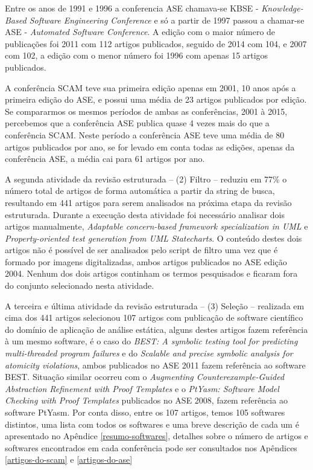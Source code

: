 Entre os anos de 1991 e 1996 a conferencia ASE chamava-se KBSE - {\it
Knowledge-Based Software Engineering Conference} e só a partir de 1997 passou a
chamar-se ASE - {\it Automated Software Conference}. A edição com o maior
número de publicações foi 2011 com 112 artigos publicados, seguido de 2014 com
104, e 2007 com 102, a edição com o menor número foi 1996 com apenas 15 artigos
publicados.

A conferência SCAM teve sua primeira edição apenas em 2001, 10 anos após a
primeira edição do ASE, e possui uma média de 23 artigos publicados por edição.
Se compararmos os mesmos períodos de ambas as conferências, 2001 à 2015,
percebemos que a conferência ASE publica quase 4 vezes mais do que a
conferência SCAM. Neste período a conferência ASE teve uma média de 80 artigos
publicados por ano, se for levado em conta todas as edições, apenas da
conferência ASE, a média cai para 61 artigos por ano.

A segunda atividade da revisão estruturada -- (2) Filtro -- reduziu em 77\%
o número total de artigos de forma automática a partir da string de busca, resultando em 441 artigos
para serem analisados na próxima etapa da revisão estruturada.  Durante a execução desta
atividade foi necessário analisar dois artigos manualmente, {\it Adaptable
concern-based framework specialization in UML} e {\it Property-oriented test
generation from UML Statecharts}. O conteúdo destes dois artigos não é possível
de ser analisados pelo script de filtro uma vez que é formado por imagens
digitalizadas, ambos artigos publicados no ASE edição 2004. Nenhum dos dois
artigos continham os termos pesquisados e ficaram fora do conjunto selecionado
nesta atividade.

A terceira e última atividade da revisão estruturada -- (3) Seleção --
realizada em cima dos 441 artigos selecionou 107 artigos com publicação de
software científico do domínio de aplicação de análise estática, alguns destes
artigos fazem referência à um mesmo software, é o caso do {\it BEST: A symbolic
testing tool for predicting multi-threaded program failures} e do {\it Scalable
and precise symbolic analysis for atomicity violations}, ambos publicados no
ASE 2011 fazem referência ao software BEST. Situação similar ocorreu com o {\it Augmenting
Counterexample-Guided Abstraction Refinement with Proof Templates} e o {\it
PtYasm: Software Model Checking with Proof Templates} publicados no ASE 2008,
fazem referência ao software PtYasm. Por conta disso, entre os 107 artigos, temos
105 softwares distintos, uma lista com todos os softwares e uma breve descrição
de cada um é apresentado no Apêndice \ref{resumo-softwares},
detalhes sobre o número de artigos e softwares encontrados em cada conferência
pode ser consultados nos Apêndices \ref{artigos-do-scam} e \ref{artigos-do-ase} 

